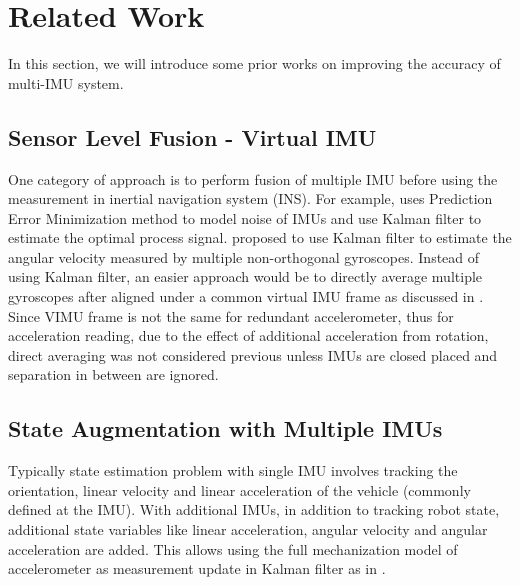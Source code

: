 \documentclass[conference]{IEEEtran}
\begin{document}

\section{Related Work}

In this section, we will introduce some prior works on improving the accuracy of multi-IMU system.


\subsection{Sensor Level Fusion - Virtual IMU}\label{VIMU}

One category of approach is to perform fusion of multiple IMU before using the measurement in inertial navigation system (INS). For example, \cite{jafari2014_PEM} uses Prediction Error Minimization method to model noise of IMUs and use Kalman filter to estimate the optimal process signal. \cite{xue2023} proposed to use Kalman filter to estimate the angular velocity measured by multiple non-orthogonal gyroscopes. Instead of using Kalman filter, an easier approach would be to directly average multiple gyroscopes after aligned under a common virtual IMU frame as discussed in \cite{waegli2008, patel2022_multi-imu, Colomina2004REDUNDANTIF}. Since VIMU frame is not the same for redundant accelerometer, thus for acceleration reading, due to the effect of additional acceleration from rotation, direct averaging was not considered previous unless IMUs are closed placed and separation in between are ignored.

\subsection{State Augmentation with Multiple IMUs}\label{augmented}

Typically state estimation problem with single IMU involves tracking the orientation, linear velocity and linear acceleration of the vehicle (commonly defined at the IMU). With additional IMUs, in addition to tracking robot state, additional state variables like linear acceleration, angular velocity and angular acceleration are added. This allows using the full mechanization model of accelerometer as measurement update in Kalman filter as in \cite{Bancroft2011DataFA, Beaudoin2018_satelite}.
\end{document}
